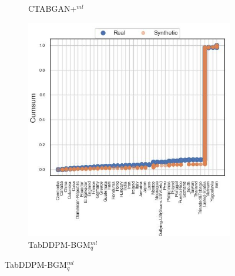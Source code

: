 \begin{figure}[H]
\begin{subfigure}{0.3\textwidth}
		\caption{CTABGAN+$^{ml}$}
	\end{subfigure}
	\begin{subfigure}{0.3\textwidth}
		\centering
		\includegraphics[width=\textwidth]{images/cdf/tab-ddpm-bgm.jpg}
		\caption{TabDDPM-BGM$^{ml}_q$}
	\end{subfigure}



\end{figure}
